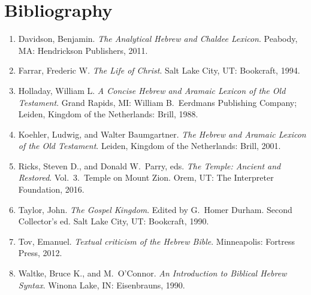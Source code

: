 \section{Bibliography}
\begin{enumerate}
  \item Davidson, Benjamin. \textit{The Analytical Hebrew and Chaldee Lexicon}. Peabody, MA: Hendrickson Publishers, 2011.
  \item Farrar, Frederic W. \textit{The Life of Christ}. Salt Lake City, UT: Bookcraft, 1994.
  \item Holladay, William L. \textit{A Concise Hebrew and Aramaic Lexicon of the Old Testament}. Grand Rapids, MI: William B.\ Eerdmans Publishing Company; Leiden, Kingdom of the Netherlands: Brill, 1988.
  \item Koehler, Ludwig, and Walter Baumgartner. \textit{The Hebrew and Aramaic Lexicon of the Old Testament}. Leiden, Kingdom of the Netherlands: Brill, 2001.
  \item Ricks, Steven D., and Donald W.\ Parry, eds. \textit{The Temple: Ancient and Restored}. Vol.\ 3.\ Temple on Mount Zion. Orem, UT: The Interpreter Foundation, 2016.
  \item Taylor, John. \textit{The Gospel Kingdom}. Edited by G.\ Homer Durham. Second Collector's ed. Salt Lake City, UT: Bookcraft, 1990.
  \item Tov, Emanuel. \textit{Textual criticism of the Hebrew Bible}. Minneapolis: Fortress Press, 2012.
  \item Waltke, Bruce K., and M.\ O'Connor. \textit{An Introduction to Biblical Hebrew Syntax}. Winona Lake, IN: Eisenbrauns, 1990.
\end{enumerate}
